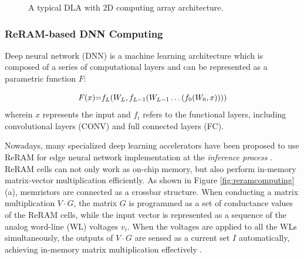 \begin{figure}
    \setlength{\abovecaptionskip}{-1pt}
    \setlength{\belowcaptionskip}{0pt}
            \caption{A typical DLA with 2D computing array architecture.}
            \label{fig:accelerator}
            \vspace{-1em}
\end{figure}

\subsubsection{ ReRAM-based DNN Computing}

Deep neural network (DNN) is a  machine learning architecture which is composed of a series of computational layers and can be represented as a parametric function ${F}$:


\begin{equation} 
    F(x){\rm{ = }}{f_L}({W _L},{f_{L - 1}}({W _{L - 1}} \ldots ({f_0}({W _0},x))))
\end{equation} 
wherein ${x}$ represents the input and ${f_i}$ refers to the functional layers, including convolutional layers (CONV) and full connected layers (FC).

Nowadays, many specialized deep learning accelerators have been proposed to use ReRAM for edge neural network implementation at the \emph{inference process} \cite{7551380, 7920854}. ReRAM cells can not only work as on-chip memory, but also perform in-memory matrix-vector multiplication efficiently. As shown in Figure \ref{fig:reramcomputing} (a), memristors are connected as a crossbar structure. When conducting a matrix multiplication $V \cdot G$,  the matrix $G$ is programmed as a set of  conductance values of the ReRAM cells, while the input vector is represented as a sequence of the analog word-line (WL) voltages $v_i$. When the voltages are applied to all the WLs simultaneously, the outputs of $V \cdot G$  are sensed as a current set $I$ automatically, achieving in-memory matrix multiplication effectively \cite{Liu:2019:FTN:3287624.3288743}. 

